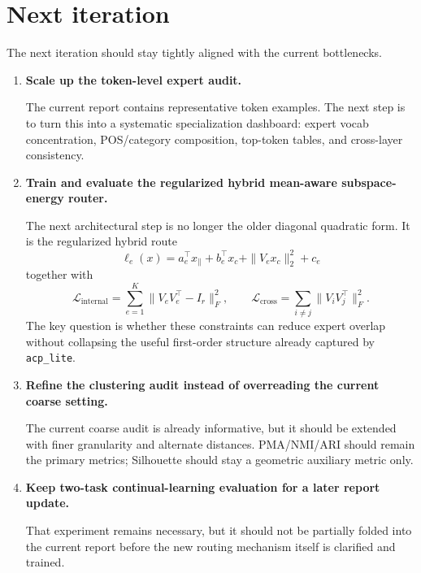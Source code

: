 \documentclass[11pt]{article}
\begin{document}
\section{Next iteration}

The next iteration should stay tightly aligned with the current bottlenecks.

\begin{enumerate}
    \item \textbf{Scale up the token-level expert audit.}
    
    The current report contains representative token examples. The next step is to turn this into a systematic specialization dashboard: expert vocab concentration, POS/category composition, top-token tables, and cross-layer consistency.

    \item \textbf{Train and evaluate the regularized hybrid mean-aware subspace-energy router.}

    The next architectural step is no longer the older diagonal quadratic form. It is the regularized hybrid route
    \[
    \ell_e(x)
    =
    a_e^\top x_{\parallel}
    +
    b_e^\top x_c
    +
    \|V_e x_c\|_2^2
    +
    c_e
    \]
    together with
    \[
    \mathcal{L}_{\mathrm{internal}}
    =
    \sum_{e=1}^{K}\|V_eV_e^\top-I_r\|_F^2,
    \qquad
    \mathcal{L}_{\mathrm{cross}}
    =
    \sum_{i\neq j}\|V_iV_j^\top\|_F^2.
    \]
    The key question is whether these constraints can reduce expert overlap without collapsing the useful first-order structure already captured by \texttt{acp\_lite}.

    \item \textbf{Refine the clustering audit instead of overreading the current coarse setting.}

    The current coarse audit is already informative, but it should be extended with finer granularity and alternate distances. PMA/NMI/ARI should remain the primary metrics; Silhouette should stay a geometric auxiliary metric only.

    \item \textbf{Keep two-task continual-learning evaluation for a later report update.}

    That experiment remains necessary, but it should not be partially folded into the current report before the new routing mechanism itself is clarified and trained.
\end{enumerate}
\end{document}

